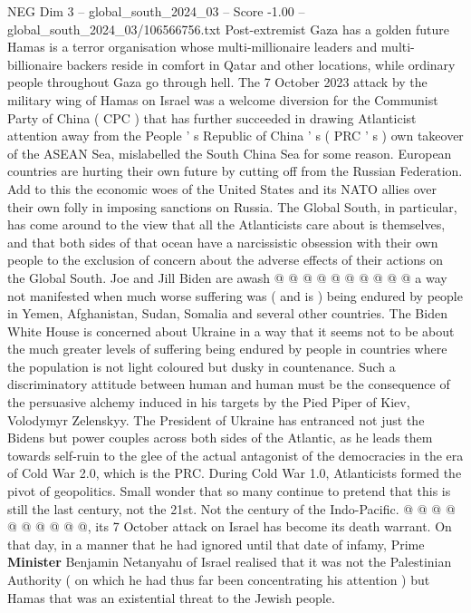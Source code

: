 \begin{textsample}{NEG Dim 3 – global\_south\_2024\_03 – Score -1.00 – global\_south\_2024\_03/106566756.txt}  \label{ex:f3_neg_046}
Post-extremist Gaza has a golden future Hamas is a terror organisation whose multi-millionaire leaders and multi-billionaire backers reside in comfort in Qatar and other locations, while ordinary people throughout Gaza go through hell.
The 7 October 2023 attack by the military wing of Hamas on Israel was a welcome diversion for the Communist Party of China ( CPC ) that has further succeeded in drawing Atlanticist attention away from the People ' s Republic of China ' s ( PRC ' s ) own takeover of the ASEAN Sea, mislabelled the South China Sea for some reason.
European countries are hurting their own future by cutting off from the Russian Federation.
Add to this the economic woes of the United States and its NATO allies over their own folly in imposing sanctions on Russia.
The Global South, in particular, has come around to the view that all the Atlanticists care about is themselves, and that both sides of that ocean have a narcissistic obsession with their own people to the exclusion of concern about the adverse effects of their actions on the Global South.
Joe and Jill Biden are awash @ @ @ @ @ @ @ @ @ @ a way not manifested when much worse suffering was ( and is ) being endured by people in Yemen, Afghanistan, Sudan, Somalia and several other countries.
The Biden White House is concerned about Ukraine in a way that it seems not to be about the much greater levels of suffering being endured by people in countries where the population is not light coloured but dusky in countenance.
Such a discriminatory attitude between human and human must be the consequence of the persuasive alchemy induced in his targets by the Pied Piper of Kiev, Volodymyr Zelenskyy.
The President of Ukraine has entranced not just the Bidens but power couples across both sides of the Atlantic, as he leads them towards self-ruin to the glee of the actual antagonist of the democracies in the era of Cold War 2.0, which is the PRC.
During Cold War 1.0, Atlanticists formed the pivot of geopolitics.
Small wonder that so many continue to pretend that this is still the last century, not the 21st.
Not the century of the Indo-Pacific. @ @ @ @ @ @ @ @ @ @, its 7 October attack on Israel has become its death warrant.
On that day, in a manner that he had ignored until that date of infamy, Prime \textbf{Minister} Benjamin Netanyahu of Israel realised that it was not the Palestinian Authority ( on which he had thus far been concentrating his attention ) but Hamas that was an existential threat to the Jewish people.

\end{textsample}
